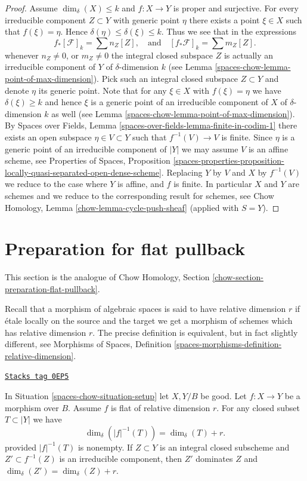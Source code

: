 \begin{proof}
\medskip\noindent
Assume $\dim_\delta(X) \leq k$ and $f : X \to Y$ is proper and surjective.
For every irreducible component $Z \subset Y$
with generic point $\eta$ there exists a point $\xi \in X$ such
that $f(\xi) = \eta$. Hence $\delta(\eta) \leq \delta(\xi) \leq k$.
Thus we see that in the expressions
$$
f_*[\mathcal{F}]_k = \sum n_Z[Z],
\quad
\text{and}
\quad
[f_*\mathcal{F}]_k = \sum m_Z[Z].
$$
whenever $n_Z \not = 0$, or $m_Z \not = 0$ the integral closed
subspace $Z$ is actually an irreducible component of $Y$ of
$\delta$-dimension $k$ (see Lemma \ref{spaces-chow-lemma-point-of-max-dimension}).
Pick such an integral closed subspace $Z \subset Y$ and denote $\eta$
its generic point.
Note that for any $\xi \in X$ with $f(\xi) = \eta$ we have $\delta(\xi) \geq k$
and hence $\xi$ is a generic point of an irreducible component
of $X$ of $\delta$-dimension $k$ as well
(see Lemma \ref{spaces-chow-lemma-point-of-max-dimension}).
By Spaces over Fields, Lemma \ref{spaces-over-fields-lemma-finite-in-codim-1}
there exists an open subspace $\eta \in V \subset Y$
such that $f^{-1}(V) \to V$ is finite.
Since $\eta$ is a generic point of an irreducible component of
$|Y|$ we may assume $V$ is an affine scheme, see
Properties of Spaces, Proposition
\ref{spaces-properties-proposition-locally-quasi-separated-open-dense-scheme}.
Replacing $Y$ by $V$ and $X$ by $f^{-1}(V)$ we reduce to the
case where $Y$ is affine, and $f$ is finite.
In particular $X$ and $Y$ are schemes and we reduce to
the corresponding result for schemes, see
Chow Homology, Lemma \ref{chow-lemma-cycle-push-sheaf}
(applied with $S = Y$).
\end{proof}

\section{Preparation for flat pullback}
\label{spaces-chow-section-preparation-flat-pullback}
This section is the analogue of
Chow Homology, Section \ref{chow-section-preparation-flat-pullback}.

\medskip\noindent
Recall that a morphism of algebraic spaces is said to have
relative dimension $r$ if \'etale locally on the source
and the target we get a morphism of schemes which has relative dimension $r$.
The precise definition is equivalent, but in fact slightly different, see
Morphisms of Spaces, Definition
\ref{spaces-morphisms-definition-relative-dimension}.

\begin{lemma}
\label{spaces-chow-lemma-flat-inverse-image-dimension}
\href{https://stacks.math.columbia.edu/tag/0EP5}{\texttt{Stacks tag 0EP5}}

In Situation \ref{spaces-chow-situation-setup} let $X, Y/B$ be good.
Let $f : X \to Y$ be a morphism over $B$.
Assume $f$ is flat of relative dimension $r$.
For any closed subset $T \subset |Y|$ we have
$$
\dim_\delta(|f|^{-1}(T)) = \dim_\delta(T) + r.
$$
provided $|f|^{-1}(T)$ is nonempty.
If $Z \subset Y$ is an integral closed subscheme and
$Z' \subset f^{-1}(Z)$ is an irreducible component, then
$Z'$ dominates $Z$ and $\dim_\delta(Z') = \dim_\delta(Z) + r$.
\end{lemma}

